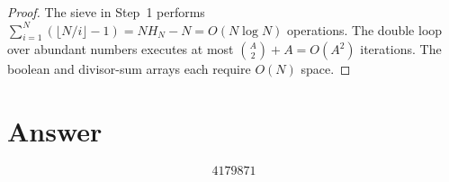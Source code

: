 \documentclass[12pt,a4paper]{article}
\theoremstyle{definition}
\theoremstyle{remark}
\begin{document}
\begin{proof}
The sieve in Step~1 performs $\sum_{i=1}^{N}(\lfloor N/i\rfloor - 1) = N H_N - N = O(N \log N)$ operations. The double loop over abundant numbers executes at most $\binom{A}{2} + A = O(A^2)$ iterations. The boolean and divisor-sum arrays each require $O(N)$ space.
\end{proof}

\section{Answer}

\[
\boxed{4179871}
\]
\end{document}
